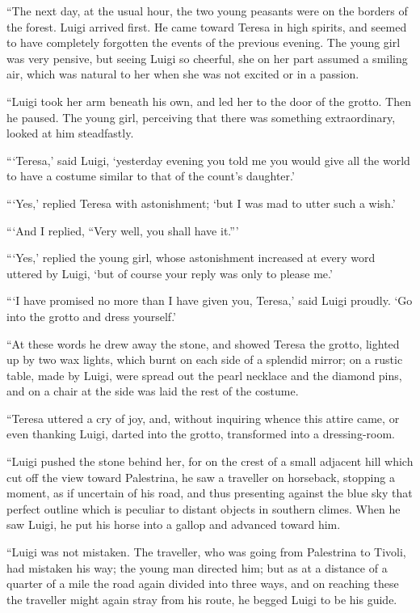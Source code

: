 “The next day, at the usual hour, the two young peasants were on the
borders of the forest. Luigi arrived first. He came toward Teresa in
high spirits, and seemed to have completely forgotten the events of the
previous evening. The young girl was very pensive, but seeing Luigi so
cheerful, she on her part assumed a smiling air, which was natural to
her when she was not excited or in a passion.

“Luigi took her arm beneath his own, and led her to the door of the
grotto. Then he paused. The young girl, perceiving that there was
something extraordinary, looked at him steadfastly.

“‘Teresa,’ said Luigi, ‘yesterday evening you told me you would give
all the world to have a costume similar to that of the count’s
daughter.’

“‘Yes,’ replied Teresa with astonishment; ‘but I was mad to utter such
a wish.’

“‘And I replied, “Very well, you shall have it.”’

“‘Yes,’ replied the young girl, whose astonishment increased at every
word uttered by Luigi, ‘but of course your reply was only to please
me.’

“‘I have promised no more than I have given you, Teresa,’ said Luigi
proudly. ‘Go into the grotto and dress yourself.’

“At these words he drew away the stone, and showed Teresa the grotto,
lighted up by two wax lights, which burnt on each side of a splendid
mirror; on a rustic table, made by Luigi, were spread out the pearl
necklace and the diamond pins, and on a chair at the side was laid the
rest of the costume.

“Teresa uttered a cry of joy, and, without inquiring whence this attire
came, or even thanking Luigi, darted into the grotto, transformed into
a dressing-room.

“Luigi pushed the stone behind her, for on the crest of a small
adjacent hill which cut off the view toward Palestrina, he saw a
traveller on horseback, stopping a moment, as if uncertain of his road,
and thus presenting against the blue sky that perfect outline which is
peculiar to distant objects in southern climes. When he saw Luigi, he
put his horse into a gallop and advanced toward him.

“Luigi was not mistaken. The traveller, who was going from Palestrina
to Tivoli, had mistaken his way; the young man directed him; but as at
a distance of a quarter of a mile the road again divided into three
ways, and on reaching these the traveller might again stray from his
route, he begged Luigi to be his guide.

